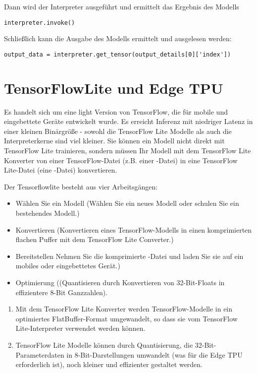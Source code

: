 Dann wird der Interpreter ausgeführt und ermittelt das Ergebnis des Modells
\begin{lstlisting}[frame=none, numbers=none]
interpreter.invoke()
\end{lstlisting}

Schließlich kann die Ausgabe des Modells ermittelt und ausgelesen werden:
\begin{lstlisting}[frame=none, numbers=none]
output_data = interpreter.get_tensor(output_details[0]['index'])
\end{lstlisting}




\chapter{TensorFlowLite und Edge TPU}
Es handelt sich um eine light Version von TensorFlow, die für mobile und eingebettete Geräte entwickelt wurde. 
Es erreicht Inferenz mit niedriger Latenz in einer kleinen Binärgröße - sowohl die TensorFlow Lite Modelle als auch 
die Interpreterkerne sind viel kleiner. Sie können ein Modell nicht direkt mit TensorFlow Lite trainieren, sondern müssen Ihr
 Modell mit dem TensorFlow Lite Konverter von einer TensorFlow-Datei (z.B. einer -Datei) in eine TensorFlow Lite-Datei 
(eine -Datei) konvertieren.\cite{GoogleCoral:2019}

\bigskip

Der Tensorflowlite besteht aus vier Arbeitsgängen:

\begin{itemize}
	\item Wählen Sie ein Modell (Wählen Sie ein neues Modell 
	oder schulen Sie ein bestehendes Modell.)
	\item Konvertieren (Konvertieren eines TensorFlow-Modells 
	in einen komprimierten flachen Puffer mit dem TensorFlow Lite Converter.)
	\item Bereitstellen Nehmen Sie die komprimierte 
	-Datei und laden Sie sie 
	auf ein mobiles oder eingebettetes Gerät.)
	\item Optimierung ((Quantisieren durch Konvertieren von 
	32-Bit-Floats in effizientere 8-Bit 
	Ganzzahlen).\cite{GoogleTensorFlowLite:2019}
\end{itemize}

\bigskip

\begin{enumerate}
	\item Mit dem TensorFlow Lite Konverter werden 
	TensorFlow-Modelle in ein optimiertes FlatBuffer-Format 
	umgewandelt, so dass sie vom TensorFlow Lite-Interpreter 
	verwendet werden können.\cite{GoogleTensorFlowLite:2019}
	\item TensorFlow Lite Modelle können durch Quantisierung, die 
	32-Bit-Parameterdaten in 8-Bit-Darstellungen umwandelt
	(was für die Edge TPU erforderlich ist), noch kleiner 
	und effizienter gestaltet werden.\cite{GoogleCoral:2019}
\end{enumerate}


